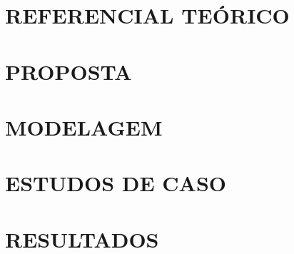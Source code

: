 \documentclass[
        oneside,      %
        english,			
        brazil			 
        ]{configcefetmglpd}
\begin{document}
\chapter{REFERENCIAL TEÓRICO} \label{cap:referencial}


\chapter{PROPOSTA} \label{cap:proposta}


\chapter{MODELAGEM} \label{cap:modelagem}


\chapter{ESTUDOS DE CASO}


\chapter{RESULTADOS}








\postextual



\appendix


\end{document}
